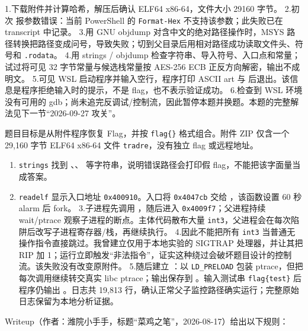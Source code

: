 1.下载附件并计算哈希，解压后确认 ELF64 x86-64，文件大小 29160 字节。 2.初次 \texttt{} 报参数错误：当前 PowerShell 的 \texttt{Format-Hex} 不支持该参数；此失败已在 transcript 中记录。 3.用 GNU objdump 对含中文的绝对路径操作时，MSYS 路径转换把路径变成问号，导致失败；切到父目录后用相对路径成功读取文件头、符号和 \texttt{.rodata}。 4.用 strings / objdump 检查字符串、导入符号、入口点和常量；试过将可见 32 字节常量与候选栈常量按 AES-256 ECB 正反方向解密，输出不成明文。 5.可见 WSL 启动程序并输入空行，程序打印 ASCII art 与 \texttt{} 后退出。该信息是程序拒绝输入时的提示，不是 flag，也不表示验证成功。 6.检查到 WSL 环境没有可用的 gdb；尚未追完反调试/控制流，因此暂停本题并换题。本题的完整解法见下一节``2026-09-27 攻关''。

题目目标是从附件程序恢复 Flag，并按 \texttt{flag\{\}} 格式组合。附件 ZIP 仅含一个 29,160 字节 ELF64 x86-64 文件 \texttt{tradre}，没有独立 flag 或远程地址。

\begin{enumerate}
\def\labelenumi{\arabic{enumi}.}
\tightlist
\item
  \texttt{strings} 找到 \texttt{}、\texttt{}、\texttt{} 等字符串，说明错误路径会打印假 flag，不能把该字面量当成答案。
\item
  \texttt{readelf} 显示入口地址 \texttt{0x400910}。入口将 \texttt{0x4047cb} 交给 \texttt{}，该函数设置 60 秒 alarm 后 fork。 3.子进程先调用 \texttt{}，随后进入 \texttt{0x4009f7}；父进程持续 wait/ptrace 观察子进程的断点。主体代码散布大量 \texttt{int3}，父进程会在每次陷阱后改写子进程寄存器/栈，再继续执行。 4.因此不能把所有 \texttt{int3} 当普通无操作指令直接跳过。我曾建立仅用于本地实验的 SIGTRAP 处理器，并让其把 RIP 加 1；运行立即触发``非法指令''，证实这种绕过会破坏题目设计的控制流。该失败没有改变原附件。 5.随后建立 \texttt{}：以 \texttt{LD\_PRELOAD} 包装 ptrace，但把每次调用继续转交真实 libc ptrace；输出保存到 \texttt{}。输入测试串 \texttt{flag\{test\}} 后程序仍输出 \texttt{}。日志共 19,813 行，确认正常父子监控路径确实运行；完整原始日志保留为本地分析证据。
\end{enumerate}

Writeup（作者：潍院小手手，标题``菜鸡之笔''，2026-08-17）给出以下规则：


